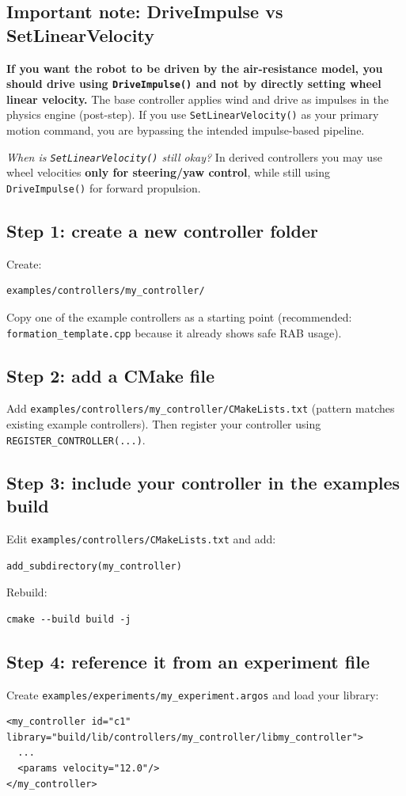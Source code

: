 \documentclass[11pt,a4paper]{article}
\begin{document}
\subsection{Important note: DriveImpulse vs SetLinearVelocity}
\textbf{If you want the robot to be driven by the air-resistance model, you should drive using \texttt{DriveImpulse()} and not by directly setting wheel linear velocity.}
The base controller applies wind and drive as impulses in the physics engine (post-step). If you use \texttt{SetLinearVelocity()} as your primary motion command, you are bypassing the intended impulse-based pipeline.

\emph{When is \texttt{SetLinearVelocity()} still okay?} In derived controllers you may use wheel velocities \textbf{only for steering/yaw control}, while still using \texttt{DriveImpulse()} for forward propulsion.

\subsection{Step 1: create a new controller folder}
Create:
\begin{lstlisting}
examples/controllers/my_controller/
\end{lstlisting}

Copy one of the example controllers as a starting point (recommended: \texttt{formation\_template.cpp} because it already shows safe RAB usage).

\subsection{Step 2: add a CMake file}
Add \texttt{examples/controllers/my\_controller/CMakeLists.txt} (pattern matches existing example controllers).
Then register your controller using \texttt{REGISTER\_CONTROLLER(...)}.

\subsection{Step 3: include your controller in the examples build}
Edit \texttt{examples/controllers/CMakeLists.txt} and add:
\begin{lstlisting}
add_subdirectory(my_controller)
\end{lstlisting}

Rebuild:
\begin{lstlisting}
cmake --build build -j
\end{lstlisting}

\subsection{Step 4: reference it from an experiment file}
Create \texttt{examples/experiments/my\_experiment.argos} and load your library:
\begin{lstlisting}
<my_controller id="c1" library="build/lib/controllers/my_controller/libmy_controller">
  ...
  <params velocity="12.0"/>
</my_controller>
\end{lstlisting}
\end{document}
